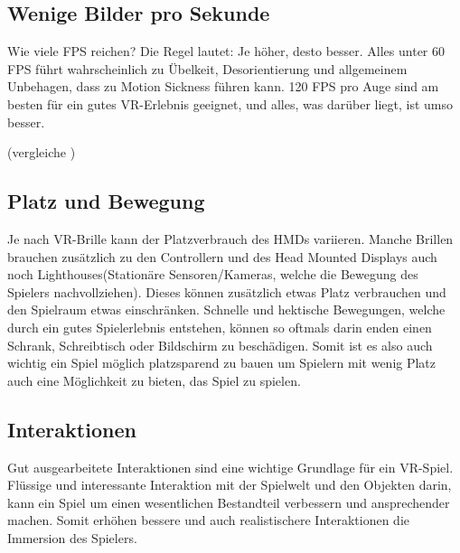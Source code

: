 \subsection{Wenige Bilder pro Sekunde}
Wie viele FPS reichen?
Die Regel lautet: Je höher, desto besser. Alles unter 60 FPS führt wahrscheinlich zu Übelkeit, Desorientierung und allgemeinem Unbehagen, dass zu Motion Sickness führen kann. 120 FPS pro Auge sind am besten für ein gutes VR-Erlebnis geeignet, und alles, was darüber liegt, ist umso besser.

(vergleiche \cite{_vr_linde})

\subsection{Platz und Bewegung}
Je nach VR-Brille kann der Platzverbrauch des HMDs variieren. Manche Brillen brauchen zusätzlich zu den Controllern und des Head Mounted Displays auch noch Lighthouses(Stationäre Sensoren/Kameras, welche die Bewegung des Spielers nachvollziehen). Dieses können zusätzlich etwas Platz verbrauchen und den Spielraum etwas einschränken. Schnelle und hektische Bewegungen, welche durch ein gutes Spielerlebnis entstehen, können so oftmals darin enden einen Schrank, Schreibtisch oder Bildschirm zu beschädigen. Somit ist es also auch wichtig ein Spiel möglich platzsparend zu bauen um Spielern mit wenig Platz auch eine Möglichkeit zu bieten, das Spiel zu spielen.

\subsection{Interaktionen}
Gut ausgearbeitete Interaktionen sind eine wichtige Grundlage für ein VR-Spiel. Flüssige und interessante Interaktion mit der Spielwelt und den Objekten darin, kann ein Spiel um einen wesentlichen Bestandteil verbessern und ansprechender machen. Somit erhöhen bessere und auch realistischere Interaktionen die Immersion des Spielers.